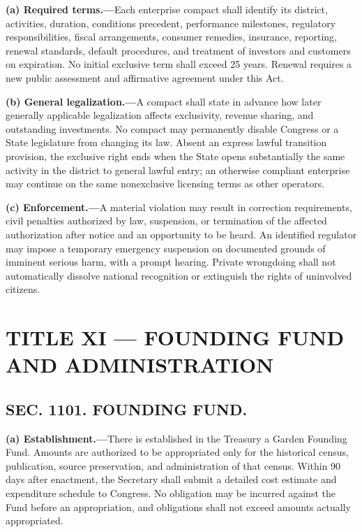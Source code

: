 \documentclass[12pt,letterpaper]{article}
\begin{document}
\textbf{(a) Required terms.---}Each enterprise compact shall identify its district, activities, duration, conditions precedent, performance milestones, regulatory responsibilities, fiscal arrangements, consumer remedies, insurance, reporting, renewal standards, default procedures, and treatment of investors and customers on expiration. No initial exclusive term shall exceed 25 years. Renewal requires a new public assessment and affirmative agreement under this Act.

\textbf{(b) General legalization.---}A compact shall state in advance how later generally applicable legalization affects exclusivity, revenue sharing, and outstanding investments. No compact may permanently disable Congress or a State legislature from changing its law. Absent an express lawful transition provision, the exclusive right ends when the State opens substantially the same activity in the district to general lawful entry; an otherwise compliant enterprise may continue on the same nonexclusive licensing terms as other operators.

\textbf{(c) Enforcement.---}A material violation may result in correction requirements, civil penalties authorized by law, suspension, or termination of the affected authorization after notice and an opportunity to be heard. An identified regulator may impose a temporary emergency suspension on documented grounds of imminent serious harm, with a prompt hearing. Private wrongdoing shall not automatically dissolve national recognition or extinguish the rights of uninvolved citizens.

\section*{TITLE XI --- FOUNDING FUND AND ADMINISTRATION}

\subsection*{SEC. 1101. FOUNDING FUND.}

\textbf{(a) Establishment.---}There is established in the Treasury a Garden Founding Fund. Amounts are authorized to be appropriated only for the historical census, publication, source preservation, and administration of that census. Within 90 days after enactment, the Secretary shall submit a detailed cost estimate and expenditure schedule to Congress. No obligation may be incurred against the Fund before an appropriation, and obligations shall not exceed amounts actually appropriated.
\end{document}
